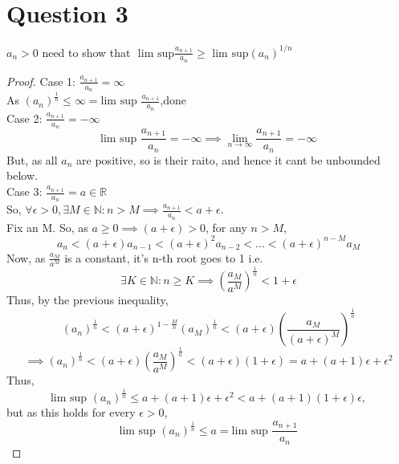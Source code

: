 \documentclass[20pt,a4paper]{extarticle} %
\theoremstyle{definition}
\theoremstyle{definition}
\begin{document}
\section*{Question 3}
$a_n > 0$ need to show that $ \text{ lim sup} \frac{a_{n+1}}{a_n} \geq \text{ lim sup}(a_n)^{1/n} $
\begin{proof}
	Case 1:  $ \frac{a_{n+1}}{a_n}=\infty $\\
	As $(a_n)^ \frac{1}{n} \leq \infty = \text{lim sup }\frac{a_{n+1}}{a_n}$,done\\

	Case 2:  $ \frac{a_{n+1}}{a_n}= -\infty $\\
	\[ \text{lim sup }  \frac{a_{n+1}}{a_n}= -\infty \implies \lim_{n \to \infty} \frac{a_{n+1}}{a_n} = -\infty\]
	But, as all $a_n$ are positive, so is their raito, and hence it cant be unbounded below. \\

	Case 3:  $ \frac{a_{n+1}}{a_n}= a \in \mathbb{R} $\\
	So, $ \forall \epsilon > 0,  \exists M \in \mathbb{N}: n > M \implies \frac{a_{n+1}}{a_n} < a+\epsilon$.\\
	Fix an M. So, as $a \geq 0 \implies (a+\epsilon)>0 $,  for any $n>M$,
	\[ a_n<(a+\epsilon) a_{n-1}<(a+\epsilon)^2 a_{n-2}<...<(a+\epsilon)^{n-M} a_M \]
	Now, as $\frac{a_M}{a^M}$ is a constant, it's n-th root goes to 1 i.e.
	\[   	\exists K \in \mathbb{N}: n \geq K \implies  (\frac{a_M}{a^M})^{ \frac{1}{n} } <1+\epsilon\]
	Thus, by the previous inequality,
	\[ (a_n)^{ \frac{1}{n} } < (a+\epsilon)^{1- \frac{M}{n} }(a_M) ^{ \frac{1}{n} }
		<(a+ \epsilon) (\frac{a_M}{(a+\epsilon)^M})^{ \frac{1}{n} }
	\]
	\[\implies (a_n)^\frac{1}{n}<(a+ \epsilon) (\frac{a_M}{a^M})^{ \frac{1}{n} } < (a+\epsilon)(1+\epsilon)=a+(a+1)\epsilon + \epsilon^2 \]
	Thus,
	\[\text{lim sup }(a_n)^ \frac{1}{n} \leq a+(a+1) \epsilon + \epsilon^2<a+(a+1)(1+\epsilon)\epsilon, \]
	but as this holds for every $\epsilon>0$,
	\[ \text{lim sup }(a_n)^ \frac{1}{n} \leq a= \text{lim sup } \frac{a_{n+1}}{a_n}  \]
\end{proof}
\newpage
\end{document}
